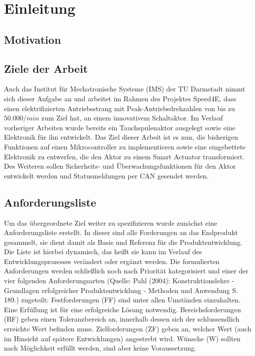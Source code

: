 \chapter{Einleitung}
\section{Motivation}


\section{Ziele der Arbeit}
Auch das Institut für Mechatronische Systeme (IMS) der TU Darmstadt nimmt sich dieser Aufgabe an und arbeitet im Rahmen des Projektes Speed4E, dass einen elektrifizierten Antriebsstrang mit Peak-Antriebsdrehzahlen von bis zu $50.000/min$ zum Ziel hat, an einem innovativem Schaltaktor. Im Verlauf vorheriger Arbeiten wurde bereits ein Tauchspulenaktor ausgelegt sowie eine Elektronik für ihn entwickelt. Das Ziel dieser Arbeit ist es nun, die bisherigen Funktionen auf einen Mikrocontroller zu implementieren sowie eine eingebettete Elektronik zu entwerfen, die den Aktor zu einem Smart Actuator transformiert. Des Weiteren sollen Sicherheits- und Überwachungsfunktionen für den Aktor entwickelt werden und Statusmeldungen per CAN gesendet werden. 

\section{Anforderungsliste}
Um das übergeordnete Ziel weiter zu spezifizieren wurde zunächst  eine Anforderungsliste erstellt. In dieser sind alle Forderungen an das Endprodukt gesammelt, sie dient damit als Basis und Referenz für die Produktentwicklung. Die Liste ist hierbei dynamisch, das heißt sie kann im Verlauf des Entwicklungsprozesses verändert oder ergänzt werden.  Die formulierten Anforderungen werden schließlich noch nach Priorität kategorisiert und einer der vier folgenden Anforderungsarten (Quelle: Pahl (2004): Konstruktionslehre - Grundlagen erfolgreicher Produktentwicklung - Methoden und Anwendung S. 189.) zugeteilt:
Festforderungen (FF) sind unter allen Umständen einzuhalten. Eine Erfüllung ist für eine erfolgreiche Lösung notwendig.
Bereichsforderungen (BF) geben einen Toleranzbereich an, innerhalb dessen sich der schlussendlich erreichte Wert befinden muss.
Zielforderungen (ZF) geben an, welcher Wert (auch im Hinsicht auf spätere Entwicklungen) angestrebt wird.
Wünsche (W) sollten nach Möglichkeit erfüllt werden, sind aber keine Voraussetzung. 

